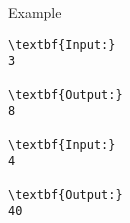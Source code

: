 Example
\begin{verbatim}
\textbf{Input:}
3

\textbf{Output:}
8

\textbf{Input:}
4

\textbf{Output:}
40\end{verbatim}
